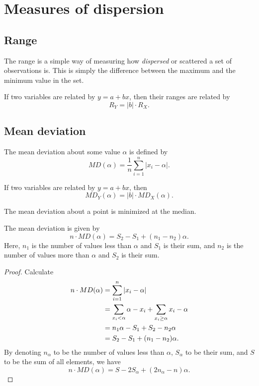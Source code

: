\documentclass[11pt]{article}
\theoremstyle{definition}
\theoremstyle{remark}
\numberwithin{equation}{section}
\begin{document}
    \section{Measures of dispersion}
    
    \subsection{Range}

    The range is a simple way of measuring how \emph{dispersed} or scattered a set of
    observations is. This is simply the difference between the maximum and the
    minimum value in the set.

    \begin{theorem}
        If two variables are related by $y = a + bx$, then their ranges are related
        by \[
            R_Y = |b|\cdot R_X.
        \] 
    \end{theorem}

    \subsection{Mean deviation}
    
    The mean deviation about some value $\alpha$ is defined by \[
        MD(\alpha) = \frac{1}{n}\sum_{i = 1}^n |x_i - \alpha|.
    \] 
    

    \begin{theorem}
        If two variables are related by $y = a + bx$, then \[
            MD_Y(\alpha) = |b|\cdot MD_X(\alpha).
        \] 
    \end{theorem}

    \begin{theorem}
        The mean deviation about a point is minimized at the median.
    \end{theorem}

    \begin{exercise}
        The mean deviation is given by \[
            n\cdot MD(\alpha) = S_2 - S_1 + (n_1 - n_2)\alpha.
        \] Here, $n_1$ is the number of values less than $\alpha$ and $S_1$ is their
        sum, and $n_2$ is the number of values more than $\alpha$ and $S_2$ is their
        sum.
    \end{exercise}
    \begin{proof}
        Calculate \begin{align*}
            n\cdot MD(\alpha) &= \sum_{i = 1}^n |x_i - \alpha| \\
                &= \sum_{x_i < \alpha} \alpha - x_i + \sum_{x_i \geq \alpha} x_i -
                \alpha \\
                &= n_1\alpha - S_1 + S_2 - n_2\alpha \\
                &= S_2 - S_1 + (n_1 - n_2)\alpha. \qedhere
        \end{align*}
        By denoting $n_\alpha$ to be the number of values less than $\alpha$,
        $S_\alpha$ to be their sum, and $S$ to be the sum of all elements, we have \[
            n\cdot MD(\alpha) = S - 2S_\alpha + (2n_\alpha - n)\alpha.
        \] 
    \end{proof}
\end{document}
